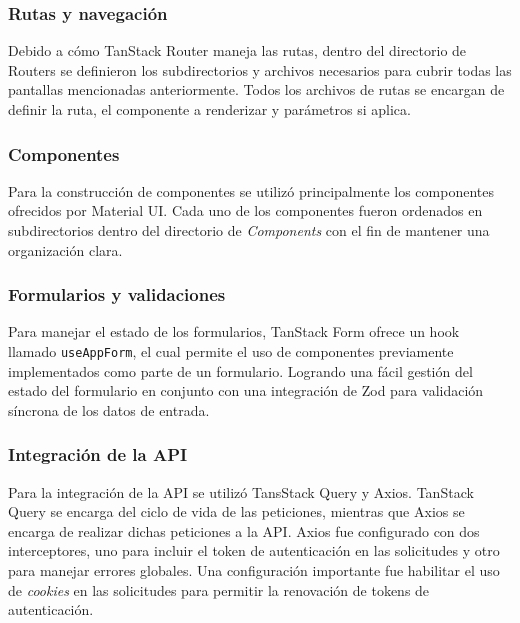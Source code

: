 \subsubsection{Rutas y navegación}
Debido a cómo TanStack Router maneja las rutas, dentro del directorio de Routers se definieron los subdirectorios y archivos necesarios
para cubrir todas las pantallas mencionadas anteriormente. Todos los archivos de rutas se encargan de definir la ruta, el componente a
renderizar y parámetros si aplica.

\subsubsection{Componentes}
Para la construcción de componentes se utilizó principalmente los componentes ofrecidos por Material UI. Cada uno de los componentes
fueron ordenados en subdirectorios dentro del directorio de \textit{Components} con el fin de mantener una organización clara.

\subsubsection{Formularios y validaciones}
Para manejar el estado de los formularios, TanStack Form ofrece un hook llamado \texttt{useAppForm}, el cual permite el uso de componentes
previamente implementados como parte de un formulario. Logrando una fácil gestión del estado del formulario en conjunto con una integración
de Zod para validación síncrona de los datos de entrada.

\subsubsection{Integración de la API}
Para la integración de la API se utilizó TansStack Query y Axios. TanStack Query se encarga del ciclo de vida de las peticiones, mientras que Axios 
se encarga de realizar dichas peticiones a la API. Axios fue configurado con dos interceptores, uno para incluir el token de autenticación en las
solicitudes y otro para manejar errores globales. Una configuración importante fue habilitar el uso de \textit{cookies} en las solicitudes para permitir 
la renovación de tokens de autenticación. 

